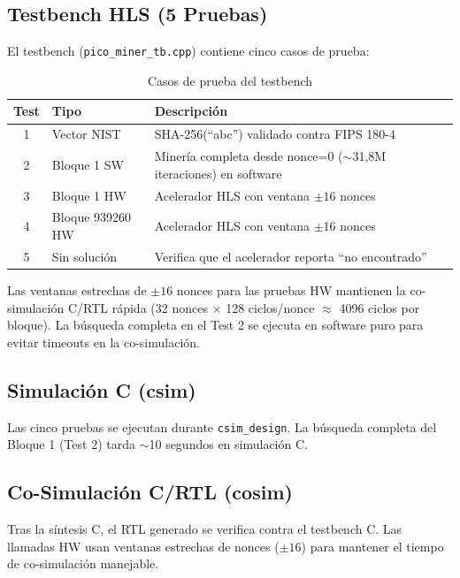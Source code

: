\documentclass[12pt,a4paper]{article}
\begin{document}
\subsection{Testbench HLS (5 Pruebas)}

El testbench (\texttt{pico\_miner\_tb.cpp}) contiene cinco casos de prueba:

\begin{table}[h]
    \centering
    \caption{Casos de prueba del testbench}
    \begin{tabular}{@{}clp{8cm}@{}}
        \toprule
        \textbf{Test} & \textbf{Tipo} & \textbf{Descripci\'on} \\
        \midrule
        1 & Vector NIST    & SHA-256(``abc'') validado contra FIPS 180-4 \\
        2 & Bloque 1 SW    & Miner\'ia completa desde nonce=0 ($\sim$31,8M iteraciones) en software \\
        3 & Bloque 1 HW    & Acelerador HLS con ventana $\pm16$ nonces \\
        4 & Bloque 939260 HW & Acelerador HLS con ventana $\pm16$ nonces \\
        5 & Sin soluci\'on  & Verifica que el acelerador reporta ``no encontrado'' \\
        \bottomrule
    \end{tabular}
\end{table}

Las ventanas estrechas de $\pm16$ nonces para las pruebas HW mantienen la
co-simulaci\'on C/RTL r\'apida (32 nonces $\times$ 128 ciclos/nonce $\approx$
4096 ciclos por bloque). La b\'usqueda completa en el Test 2 se ejecuta en
software puro para evitar timeouts en la co-simulaci\'on.

\subsection{Simulaci\'on C (csim)}

Las cinco pruebas se ejecutan durante \texttt{csim\_design}. La b\'usqueda completa
del Bloque 1 (Test 2) tarda $\sim$10 segundos en simulaci\'on C.

\subsection{Co-Simulaci\'on C/RTL (cosim)}

Tras la s\'intesis C, el RTL generado se verifica contra el testbench C.
Las llamadas HW usan ventanas estrechas de nonces ($\pm16$) para mantener
el tiempo de co-simulaci\'on manejable.
\end{document}

